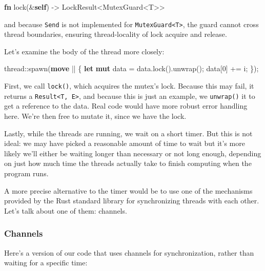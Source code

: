 \documentclass[a4paper,]{book}
\newenvironment{Shaded}{\begin{snugshade}}{\end{snugshade}}
\newcommand{\KeywordTok}[1]{\textcolor[rgb]{0.13,0.29,0.53}{\textbf{{#1}}}}
\newcommand{\DecValTok}[1]{\textcolor[rgb]{0.00,0.00,0.81}{{#1}}}
\newcommand{\NormalTok}[1]{{#1}}
\begin{document}
\begin{Shaded}
\begin{Highlighting}[]
\KeywordTok{fn} \NormalTok{lock(&}\KeywordTok{self}\NormalTok{) -> LockResult<MutexGuard<T>>}
\end{Highlighting}
\end{Shaded}

and because \texttt{Send} is not implemented for
\texttt{MutexGuard\textless{}T\textgreater{}}, the guard cannot cross
thread boundaries, ensuring thread-locality of lock acquire and release.

Let's examine the body of the thread more closely:

\begin{Shaded}
\begin{Highlighting}[]
\NormalTok{thread::spawn(}\KeywordTok{move} \NormalTok{|| \{}
    \KeywordTok{let} \KeywordTok{mut} \NormalTok{data = data.lock().unwrap();}
    \NormalTok{data[}\DecValTok{0}\NormalTok{] += i;}
\NormalTok{\});}
\end{Highlighting}
\end{Shaded}

First, we call \texttt{lock()}, which acquires the mutex's lock. Because
this may fail, it returns a
\texttt{Result\textless{}T,\ E\textgreater{}}, and because this is just
an example, we \texttt{unwrap()} it to get a reference to the data. Real
code would have more robust error handling here. We're then free to
mutate it, since we have the lock.

Lastly, while the threads are running, we wait on a short timer. But
this is not ideal: we may have picked a reasonable amount of time to
wait but it's more likely we'll either be waiting longer than necessary
or not long enough, depending on just how much time the threads actually
take to finish computing when the program runs.

A more precise alternative to the timer would be to use one of the
mechanisms provided by the Rust standard library for synchronizing
threads with each other. Let's talk about one of them: channels.

\subsubsection{Channels}\label{channels}

Here's a version of our code that uses channels for synchronization,
rather than waiting for a specific time:
\end{document}
